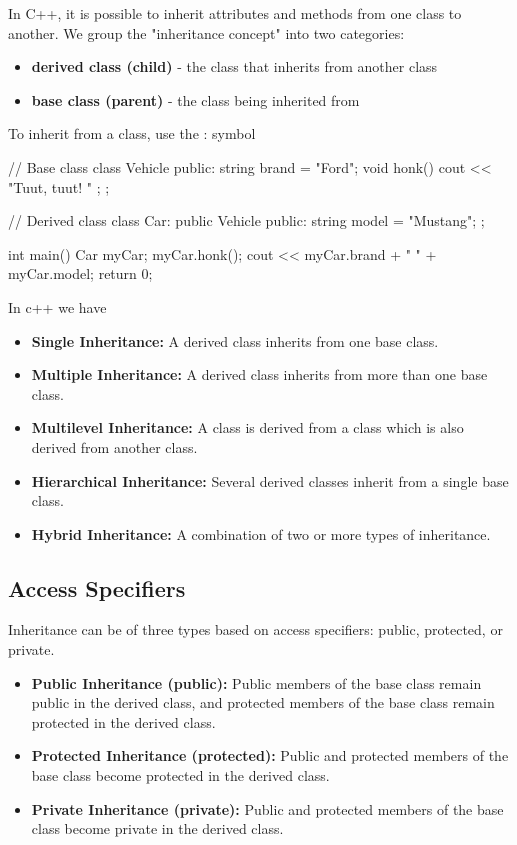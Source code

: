\documentclass{report}
\begin{document}
\begin{concept}
    \pagebreak
    \bigbreak \noindent 
    \begin{concept}
       In C++, it is possible to inherit attributes and methods from one class to another. We group the "inheritance concept" into two categories:
       \begin{itemize}
           \item \textbf{derived class (child)} - the class that inherits from another class
           \item \textbf{base class (parent)} - the class being inherited from
       \end{itemize}
       To inherit from a class, use the : symbol
    \end{concept}
    \bigbreak \noindent 
    \begin{cppcode}
// Base class
class Vehicle {
  public:
    string brand = "Ford";
    void honk() {
      cout << "Tuut, tuut! \n" ;
    }
};

// Derived class
class Car: public Vehicle {
  public:
    string model = "Mustang";
};

int main() {
  Car myCar;
  myCar.honk();
  cout << myCar.brand + " " + myCar.model;
  return 0;
}
    \end{cppcode}
    \bigbreak \noindent 
    In c++ we have
    \begin{itemize}
        \item \textbf{Single Inheritance:} A derived class inherits from one base class.
        \item \textbf{Multiple Inheritance:} A derived class inherits from more than one base class.
        \item \textbf{Multilevel Inheritance:} A class is derived from a class which is also derived from another class.
        \item \textbf{Hierarchical Inheritance:} Several derived classes inherit from a single base class.
        \item \textbf{Hybrid Inheritance:} A combination of two or more types of inheritance.
    \end{itemize}

    \pagebreak 
    \subsection{Access Specifiers}
    \bigbreak \noindent 
    Inheritance can be of three types based on access specifiers: public, protected, or private.
    \begin{itemize}
        \item \textbf{Public Inheritance (public):} Public members of the base class remain public in the derived class, and protected members of the base class remain protected in the derived class.
        \item \textbf{Protected Inheritance (protected):} Public and protected members of the base class become protected in the derived class.
        \item \textbf{Private Inheritance (private):} Public and protected members of the base class become private in the derived class.
    \end{itemize}


\end{concept}
\end{document}
